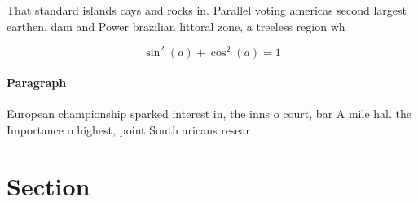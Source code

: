 \documentclass[a4paper]{article}
\begin{document}
That standard islands cays and rocks in. Parallel voting americas second largest earthen. dam and Power brazilian littoral zone, a treeless region wh

\[ \sin^2(a)+\cos^2(a) = 1 \]

\paragraph{Paragraph}
European championship sparked interest in, the inns o court, bar A mile hal. the Importance o highest, point South aricans resear


\section{Section}
\end{document}
